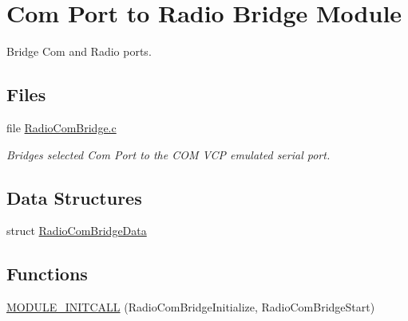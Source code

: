 \hypertarget{group___radio_com_bridge_module}{\section{Com Port to Radio Bridge Module}
\label{group___radio_com_bridge_module}
}


Bridge Com and Radio ports.  


\subsection*{Files}
\begin{DoxyCompactItemize}
\item 
file \hyperlink{_radio_com_bridge_8c}{Radio\-Com\-Bridge.\-c}
\begin{DoxyCompactList}\small\item\em Bridges selected Com Port to the C\-O\-M V\-C\-P emulated serial port. \end{DoxyCompactList}\end{DoxyCompactItemize}
\subsection*{Data Structures}
\begin{DoxyCompactItemize}
\item 
struct \hyperlink{struct_radio_com_bridge_data}{Radio\-Com\-Bridge\-Data}
\end{DoxyCompactItemize}
\subsection*{Functions}
\begin{DoxyCompactItemize}
\item 
\hyperlink{group___radio_com_bridge_module_gac3af1d46c7b58e81ee6fe55f7310226c}{M\-O\-D\-U\-L\-E\-\_\-\-I\-N\-I\-T\-C\-A\-L\-L} (Radio\-Com\-Bridge\-Initialize, Radio\-Com\-Bridge\-Start)
\end{DoxyCompactItemize}
